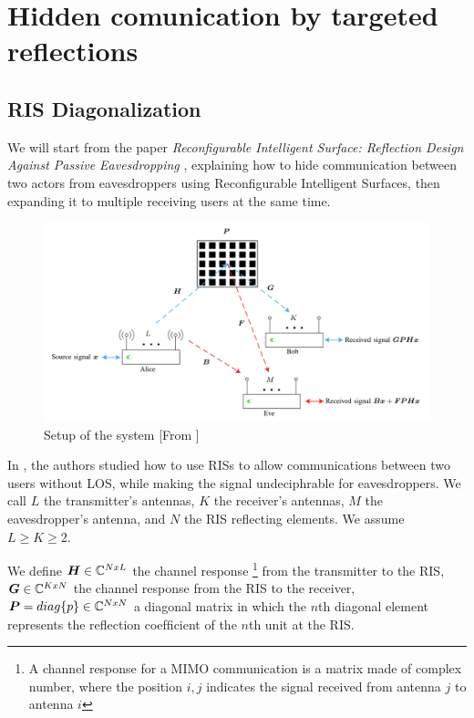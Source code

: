 \section{Hidden comunication by targeted reflections}

\subsection{RIS Diagonalization}

We will start from the paper \textit{Reconfigurable Intelligent Surface: Reflection Design Against Passive Eavesdropping} \cite{9328149}, explaining how to hide communication between two actors from eavesdroppers using Reconfigurable Intelligent Surfaces, then expanding it to multiple receiving users at the same time.

\begin{figure}[H]
  \centering
  \includegraphics[width=\linewidth]{imgs/problem-description.png}
  \caption{Setup of the system [From \cite{9328149}]}
  \label{fig:correlation_sk}
\end{figure}

In \cite{9328149}, the authors studied how to use RISs to allow communications between two users without LOS, while making the signal undeciphrable for eavesdroppers. We call $L$ the transmitter's antennas, $K$ the receiver's antennas, $M$ the eavesdropper's antenna, and $N$ the RIS reflecting elements. We assume $L \ge K \ge 2$.

We define $\bm{H} \in \mathbb{C}^{NxL}$ the channel response \footnote{A channel response for a MIMO communication is a matrix made of complex number, where the position $i,j$ indicates the signal received from antenna $j$ to antenna $i$} from the transmitter to the RIS, $\bm{G} \in \mathbb{C}^{KxN}$ the channel response from the RIS to the receiver, $\bm{P} = diag\{p\} \in \mathbb{C}^{NxN}$ a diagonal matrix in which the $n$th diagonal element represents the reﬂection coefﬁcient of the $n$th unit at the RIS.

